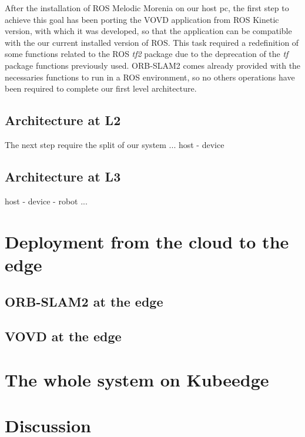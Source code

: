 After the installation of ROS Melodic Morenia \cite{rosmelodic} on our host pc, the first step to achieve this goal has been porting the VOVD \cite{VOVD} application from ROS Kinetic version, with which it was developed, so that the application can be compatible with the our current installed version of ROS. This task required a redefinition of some functions related to the ROS \textit{tf2} package \cite{tfros} due to the deprecation of the \textit{tf} package functions previously used.
ORB-SLAM2 comes already provided with the necessaries functions to run in a ROS environment, so no others operations have been required to complete our first level architecture.

\subsection{Architecture at L2} %
The next step require the split of our system ... host - device 


\subsection{Architecture at L3}	%
host - device - robot ...




\section{Deployment from the cloud to the edge}


\subsection{ORB-SLAM2 at the edge}


\subsection{VOVD at the edge}


\section{The whole system on Kubeedge}



\section{Discussion}



\clearpage
\thispagestyle{empty}
